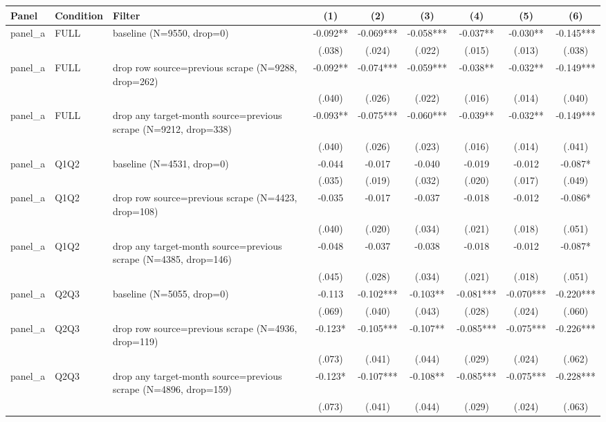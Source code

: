 \begin{tabular}{lllcccccc}
\hline
Panel & Condition & Filter & (1) & (2) & (3) & (4) & (5) & (6) \\
\hline
panel\_a & FULL & baseline (N=9550, drop=0) & -0.092** & -0.069*** & -0.058*** & -0.037** & -0.030** & -0.145***
\\
 &  &  & (.038) & (.024) & (.022) & (.015) & (.013) & (.038)
\\
panel\_a & FULL & drop row source=previous scrape (N=9288, drop=262) & -0.092** & -0.074*** & -0.059*** & -0.038** & -0.032** & -0.149***
\\
 &  &  & (.040) & (.026) & (.022) & (.016) & (.014) & (.040)
\\
panel\_a & FULL & drop any target-month source=previous scrape (N=9212, drop=338) & -0.093** & -0.075*** & -0.060*** & -0.039** & -0.032** & -0.149***
\\
 &  &  & (.040) & (.026) & (.023) & (.016) & (.014) & (.041)
\\
panel\_a & Q1Q2 & baseline (N=4531, drop=0) & -0.044 & -0.017 & -0.040 & -0.019 & -0.012 & -0.087*
\\
 &  &  & (.035) & (.019) & (.032) & (.020) & (.017) & (.049)
\\
panel\_a & Q1Q2 & drop row source=previous scrape (N=4423, drop=108) & -0.035 & -0.017 & -0.037 & -0.018 & -0.012 & -0.086*
\\
 &  &  & (.040) & (.020) & (.034) & (.021) & (.018) & (.051)
\\
panel\_a & Q1Q2 & drop any target-month source=previous scrape (N=4385, drop=146) & -0.048 & -0.037 & -0.038 & -0.018 & -0.012 & -0.087*
\\
 &  &  & (.045) & (.028) & (.034) & (.021) & (.018) & (.051)
\\
panel\_a & Q2Q3 & baseline (N=5055, drop=0) & -0.113 & -0.102*** & -0.103** & -0.081*** & -0.070*** & -0.220***
\\
 &  &  & (.069) & (.040) & (.043) & (.028) & (.024) & (.060)
\\
panel\_a & Q2Q3 & drop row source=previous scrape (N=4936, drop=119) & -0.123* & -0.105*** & -0.107** & -0.085*** & -0.075*** & -0.226***
\\
 &  &  & (.073) & (.041) & (.044) & (.029) & (.024) & (.062)
\\
panel\_a & Q2Q3 & drop any target-month source=previous scrape (N=4896, drop=159) & -0.123* & -0.107*** & -0.108** & -0.085*** & -0.075*** & -0.228***
\\
 &  &  & (.073) & (.041) & (.044) & (.029) & (.024) & (.063)

\end{tabular}
